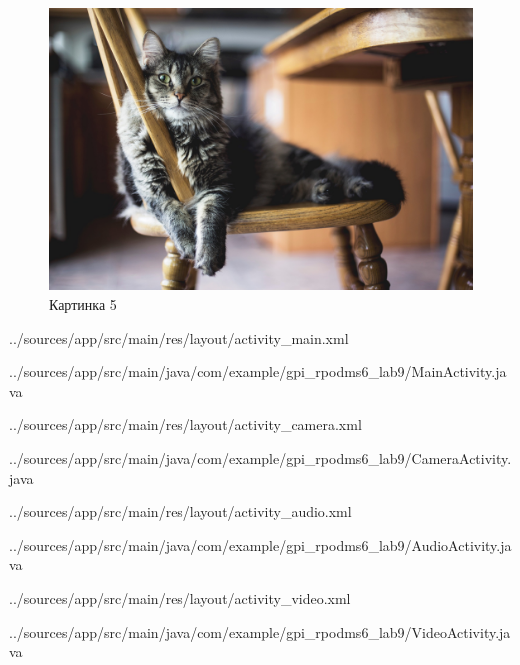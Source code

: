 \documentclass[12pt, a4paper, simple]{eskdtext}
\begin{document}
\begin{figure}[!h]
\begin{minipage}{0.19\textwidth}
            \includegraphics[width=\linewidth]
                {../sources/app/src/main/res/drawable/picture5.jpg}
            \caption{Картинка 5}
        \end{minipage}
    \end{figure}


    
    {../sources/app/src/main/res/layout/activity_main.xml}

    
    {../sources/app/src/main/java/com/example/gpi_rpodms6_lab9/MainActivity.java}

    
    
    {../sources/app/src/main/res/layout/activity_camera.xml}

    
    {../sources/app/src/main/java/com/example/gpi_rpodms6_lab9/CameraActivity.java}


    
    {../sources/app/src/main/res/layout/activity_audio.xml}

    
    {../sources/app/src/main/java/com/example/gpi_rpodms6_lab9/AudioActivity.java}


    
    {../sources/app/src/main/res/layout/activity_video.xml}

    
    {../sources/app/src/main/java/com/example/gpi_rpodms6_lab9/VideoActivity.java}
\end{document}
